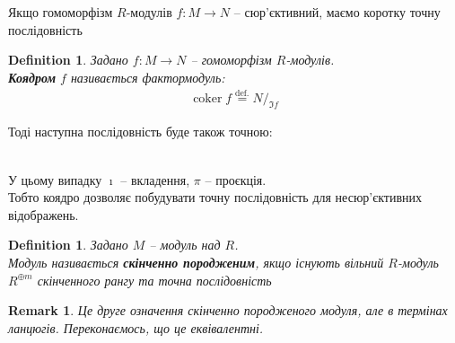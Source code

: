 \documentclass[a4paper, 10pt]{article}
\theoremstyle{theoremdd}
\theoremstyle{theoremdd}
\newtheorem{definition}[theorem]{Definition}
\theoremstyle{theoremdd}
\theoremstyle{theoremdd}
\theoremstyle{theoremdd}
\theoremstyle{theoremdd}
\theoremstyle{theoremdd}
\theoremstyle{theoremdd}
\theoremstyle{theoremdd}
\theoremstyle{theoremdd}
\theoremstyle{theoremdd}
\newtheorem{remark}[theorem]{Remark}
\theoremstyle{theoremdd}
\theoremstyle{theoremdd}
\theoremstyle{theoremdd}
\theoremstyle{theoremdd}
\DeclareMathOperator{\coker}{coker}
\begin{document}
Якщо гомоморфізм $R$-модулів $f \colon M \to N$ -- сюр'єктивний, маємо коротку точну послідовність 

\begin{definition}
Задано $f \colon M \to N$ -- гомоморфізм $R$-модулів.\\
\textbf{Коядром} $f$ називається фактормодуль:
\begin{align*}
\coker f \overset{\text{def.}}{=} N/_{\Im f}
\end{align*}
\end{definition}

Тоді наступна послідовність буде також точною: \\ \\
У цьому випадку $\imath$ -- вкладення, $\pi$ -- проєкція.\\
Тобто коядро дозволяє побудувати точну послідовність для несюр'єктивних відображень.

\begin{definition}
Задано $M$ -- модуль над $R$.\\
Модуль називається \textbf{скінченно породженим}, якщо існують вільний $R$-модуль $R^{\oplus m}$ скінченного рангу та точна послідовність
\begin{figure}[H]
\centering
{}
\end{figure}
\end{definition}

\begin{remark}
Це друге означення скінченно породженого модуля, але в термінах ланцюгів. Переконаємось, що це еквівалентні.
\end{remark}
\end{document}
